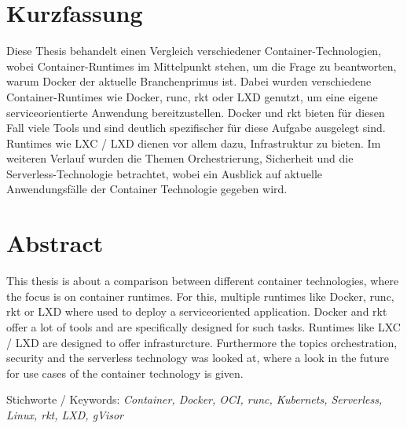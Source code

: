
\chapter{Kurzfassung}
\label{chap:kurzfassung}

Diese Thesis behandelt einen Vergleich verschiedener Container-Technologien, wobei Container-Runtimes im Mittelpunkt stehen, um die Frage zu beantworten, warum Docker der aktuelle Branchenprimus ist. Dabei wurden verschiedene Container-Runtimes wie Docker, runc, rkt oder LXD genutzt, um eine eigene serviceorientierte Anwendung bereitzustellen. Docker und rkt bieten für diesen Fall viele Tools und sind deutlich spezifischer für diese Aufgabe ausgelegt sind. Runtimes wie LXC / LXD dienen vor allem dazu, Infrastruktur zu bieten. Im weiteren Verlauf wurden die Themen Orchestrierung, Sicherheit und die Serverless-Technologie betrachtet, wobei ein Ausblick auf aktuelle Anwendungsfälle der Container Technologie gegeben wird.

\begingroup
\let\cleardoublepage\relax
\chapter{Abstract}
\label{chap:Abstract}

This thesis is about a comparison between different container technologies, where the focus is on container runtimes. For this, multiple runtimes like Docker, runc, rkt or LXD where used to deploy a serviceoriented application. Docker and rkt offer a lot of tools and are specifically designed for such tasks. Runtimes like LXC / LXD are designed to offer infrasturcture. Furthermore the topics orchestration, security and the serverless technology was looked at, where a look in the future for  use cases of the container technology is given.


Stichworte / Keywords: \textit{Container, Docker, OCI, runc, Kubernets, Serverless, Linux, rkt, LXD, gVisor}
\endgroup